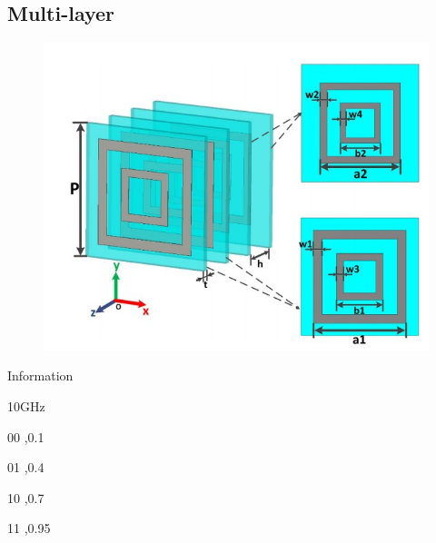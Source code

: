 \documentclass[]{article}
\begin{document}
	\subsection*{Multi-layer}
	\begin{figure}[H]
		\centering
		\includegraphics[scale=0.8]{Fig/20.jpg}
	\end{figure}

	\par Information
	\par 10GHz
	\par 00  ,0.1 
	\par 01  ,0.4 
	\par 10  ,0.7  
	\par 11  ,0.95 
\end{document}
